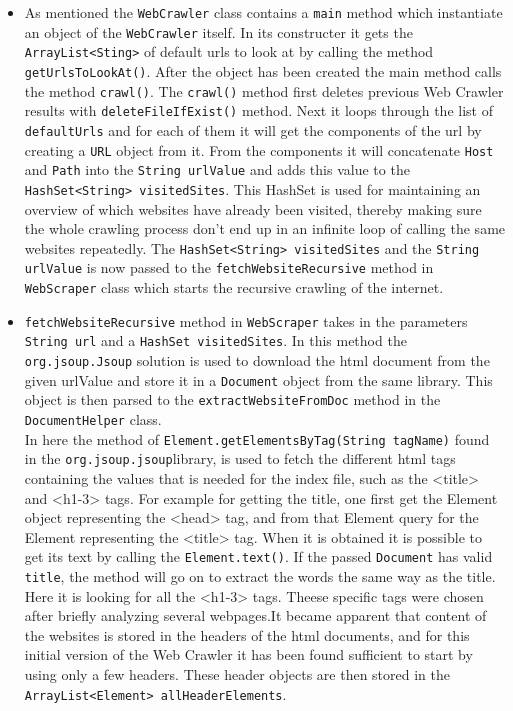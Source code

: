 \begin{itemize}
\item As mentioned the {\tt WebCrawler} class contains a {\tt main} method which instantiate an object of the {\tt WebCrawler} itself. In its constructer it gets the {\tt ArrayList<Sting>} of default urls to look at by calling the method {\tt getUrlsToLookAt()}. After the object has been created the main method calls the method {\tt crawl()}. 
The {\tt crawl()} method first deletes previous Web Crawler results with  {\tt deleteFileIfExist()} method. Next it loops through the list of {\tt defaultUrls} and for each of them it will get the components of the url by creating a {\tt URL} object from it. From the components it will concatenate {\tt Host} and {\tt Path} into the {\tt String urlValue} and adds this value to the {\tt HashSet<String> visitedSites}. This HashSet is used for maintaining an overview of which websites have already been visited, thereby making sure the whole crawling process don’t end up in an infinite loop of calling the same websites repeatedly. The {\tt HashSet<String> visitedSites} and the {\tt String urlValue} is now passed to the {\tt fetchWebsiteRecursive} method in {\tt WebScraper} class which starts the recursive crawling of the internet. 
\item {\tt fetchWebsiteRecursive} method in {\tt WebScraper} takes in the parameters {\tt String url} and a {\tt HashSet visitedSites}. In this method the {\tt org.jsoup.Jsoup} solution is used to  download the html document from the given urlValue and store it in a {\tt Document} object from the same library. This object is then parsed to the {\tt extractWebsiteFromDoc} method in the {\tt DocumentHelper} class.
\\
In here the method of {\tt Element.getElementsByTag(String tagName)} found in the {\tt org.jsoup.jsoup}\footnotemark library, is used to fetch the different html tags containing the values that is needed for the index file, such as the <title> and <h1-3> tags. For example for getting the title, one first get the Element object representing the <head> tag, and from that Element query for the Element representing the <title> tag. When it is obtained it is possible to get its text by calling the {\tt Element.text()}. 
If the passed {\tt Document} has valid {\tt title}, the method will go on to extract the words the same way as the title. Here it is looking for all the <h1-3> tags.  
Theese specific tags were chosen after briefly analyzing several webpages.It became apparent that content of the websites is stored in the headers of the html documents, and for this initial version of the Web Crawler it has been found sufficient to start by using only a few headers. These header objects are then stored in the {\tt ArrayList<Element> allHeaderElements}. 

\end{itemize}
